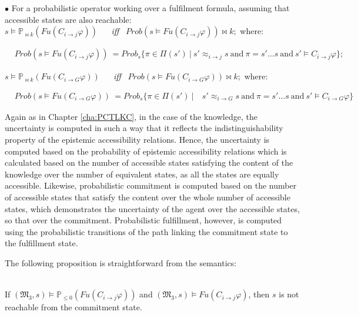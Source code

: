 \begin{definition}
\noindent $\bullet$ For a probabilistic operator working over a fulfilment formula, assuming that accessible states are also reachable:\\


\noindent $s\models \mathbb{P}_{\bowtie k}(Fu(C_{i\rightarrow j}\varphi))$
    ~~ \emph{iff}~ $Prob(s \models Fu(C_{i\rightarrow j}\varphi)) \bowtie k;$ where:

\vspace{-0.4cm}
\begin{align*}
& Prob(s\models Fu(C_{i\rightarrow j}\varphi))\ = Prob_s\{\pi \in \Pi(s') ~|~s' \approx_{i \rightarrow j}s ~\textrm{and}~ \pi = s' \ldots s ~\textrm{and}~ s' \models C_{i\rightarrow j}\varphi\};
\end{align*}

\noindent $s\models \mathbb{P}_{\bowtie k}(Fu(C_{i\rightarrow G}\varphi))$
    ~~ \emph{iff}~ $Prob(s \models Fu(C_{i\rightarrow G}\varphi)) \bowtie k;$ where:

\vspace{-0.4cm}
\begin{align*}
& Prob(s\models Fu(C_{i\rightarrow G}\varphi))\ = Prob_s\{\pi \in \Pi(s') ~|~
& s' \approx_{i \rightarrow G}s ~\textrm{and}~ \pi = s' \ldots s ~\textrm{and}~ s' \models C_{i\rightarrow G}\varphi\}
\end{align*}

\end{definition}

Again as in Chapter \ref{cha:PCTLKC}, in the case of the knowledge, the uncertainty is computed in such a way that it reflects the indistinguishability property of the epistemic accessibility relations. Hence, the uncertainty is computed based on the probability of epistemic accessibility relations which is calculated based on the number of accessible states satisfying the content of the knowledge over the number of equivalent states, as all the states are equally accessible. Likewise, probabilistic commitment is computed based on the number of accessible states that satisfy the content over the whole number of accessible states, which demonstrates the uncertainty of the agent over the accessible states, so that over the commitment. Probabilistic fulfillment, however, is computed using the probabilistic transitions of the path linking the commitment state to the fulfillment state.

The following proposition is straightforward from the semantics:

\begin{proposition} \label{proposition}~\\
If $(\mathfrak{M_3},s)\models \mathbb{P}_{\leq0} (Fu(C_{i \rightarrow
j}\varphi))$ and $(\mathfrak{M_3},s)\models Fu(C_{i \rightarrow
j}\varphi)$, then $s$ is not reachable from the commitment state.
\end{proposition}


